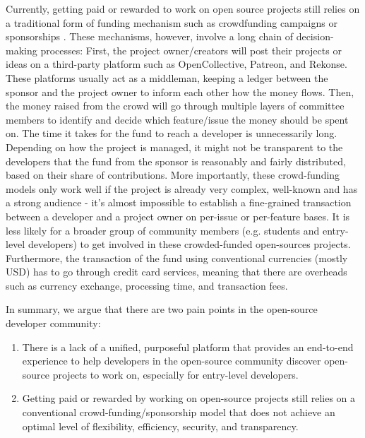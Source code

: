 \documentclass[12pt]{article}
\renewcommand{\_}{\kern-1.5pt\textunderscore\kern-1.5pt}
\begin{document}
Currently, getting paid or rewarded to work on open source projects still relies on a traditional
form of funding mechanism such as crowdfunding campaigns or sponsorships \cite{open_source_guides}.
These mechanisms, however, involve a long chain of decision-making processes: First, the project
owner/creators will post their projects or ideas on a third-party platform such as OpenCollective,
Patreon, and Rekonse. These platforms usually act as a middleman, keeping a ledger between the sponsor
and the project owner to inform each other how the money flows. Then, the money raised from the crowd
will go through multiple layers of committee members to identify and decide which feature/issue the
money should be spent on. The time it takes for the fund to reach a developer is unnecessarily long.
Depending on how the project is managed, it might not be transparent to the developers that the fund
from the sponsor is reasonably and fairly distributed, based on their share of contributions. More
importantly, these crowd-funding models only work well if the project is already very complex, well-known
and has a strong audience - it’s almost impossible to establish a fine-grained transaction between a
developer and a project owner on per-issue or per-feature bases. It is less likely for a broader group
of community members (e.g. students and entry-level developers) to get involved in these crowded-funded
open-sources projects. Furthermore, the transaction of the fund using conventional currencies (mostly USD)
has to go through credit card services, meaning that there are overheads such as currency exchange,
processing time, and transaction fees.

In summary, we argue that there are two pain points in the open-source developer community:

\begin{enumerate}

	\item There is a lack of a unified, purposeful platform that provides an end-to-end experience to
	      help developers in the open-source community discover open-source projects to work on, especially
	      for entry-level developers.

	\item Getting paid or rewarded by working on open-source projects still relies on a conventional
	      crowd-funding/sponsorship model that does not achieve an optimal level of flexibility, efficiency,
	      security, and transparency.

\end{enumerate}
\end{document}

